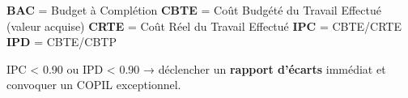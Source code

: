 \documentclass[11pt,a4paper,oneside]{report}
\begin{document}
\vspace{4pt}
{\footnotesize
\textbf{BAC} = Budget à Complétion \quad
\textbf{CBTE} = Coût Budgété du Travail Effectué (valeur acquise) \quad
\textbf{CRTE} = Coût Réel du Travail Effectué \quad
\textbf{IPC} = CBTE/CRTE \quad
\textbf{IPD} = CBTE/CBTP
}

\begin{reco}
IPC \textless{} 0.90 ou IPD \textless{} 0.90 → déclencher un \textbf{rapport d'écarts} immédiat et convoquer un COPIL exceptionnel.
\end{reco}
\end{document}
